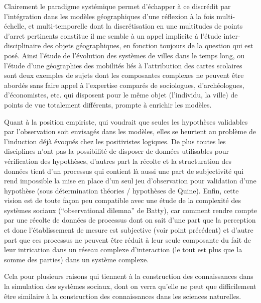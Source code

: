 Clairement le paradigme systémique permet d'échapper à ce discrédit par l'intégration dans les modèles géographiques d'une réflexion à la fois multi-échelle, et multi-temporelle dont la discrétisation en une multitudes de points d'arret pertinents constitue il me semble à un appel implicite à l'étude inter-disciplinaire des objets géographiques, en fonction toujours de la question qui est posé. Ainsi l'étude de l'évolution des systèmes de villes dans le temps long, ou l'étude d'une géographies des mobilités liés à l'attribution des cartes scolaires sont deux exemples de sujets dont les composantes complexes ne peuvent être abordés sans faire appel à l'expertise comparés de sociologues, d'archéologues, d'économistes, etc. qui disposent pour le même objet (l'individu, la ville) de points de vue totalement différents, prompte à enrichir les modèles.

Quant à la position empiriste, qui voudrait que seules les hypothèses validables par l'observation soit envisagés dans les modèles, elles se heurtent au problème de l'induction déjà évoqués chez les positivistes logiques. De plus toutes les disciplines n'ont pas la possibilité de disposer de données utilisables pour vérification des hypothèses, d'autres part la récolte et la structuration des données tient d'un processus qui contient là aussi une part de subjectivité qui rend impossible la mise en place d'un seul jeu d'observation pour validation d'une hypothèse (sous détermination théories / hypothèses de Quine). Enfin, cette vision est de toute façon peu compatible avec une étude de la complexité des systèmes sociaux (\enquote{observational dilemna} de Batty), car comment rendre compte par une récolte de données de processus dont on sait d'une part que la perception et donc l'établissement de mesure est subjective (voir point précédent) et d'autre part que ces processus ne peuvent être réduit à leur seule composante du fait de leur intrication dans un réseau complexe d'interaction (le tout est plus que la somme des parties) dans un système complexe.

Cela pour plusieurs raisons qui tiennent à la construction des connaissances dans la simulation des systèmes sociaux, dont on verra qu'elle ne peut que difficilement être similaire à la construction des connaissances dans les sciences naturelles.


